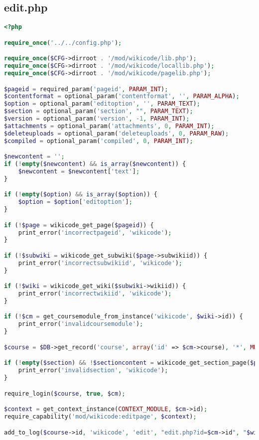 \subsection{edit.php}
\begin{lstlisting}[language=PHP]
<?php

require_once('../../config.php');

require_once($CFG->dirroot . '/mod/wikicode/lib.php');
require_once($CFG->dirroot . '/mod/wikicode/locallib.php');
require_once($CFG->dirroot . '/mod/wikicode/pagelib.php');

$pageid = required_param('pageid', PARAM_INT);
$contentformat = optional_param('contentformat', '', PARAM_ALPHA);
$option = optional_param('editoption', '', PARAM_TEXT);
$section = optional_param('section', "", PARAM_TEXT);
$version = optional_param('version', -1, PARAM_INT);
$attachments = optional_param('attachments', 0, PARAM_INT);
$deleteuploads = optional_param('deleteuploads', 0, PARAM_RAW);
$compiled = optional_param('compiled', 0, PARAM_INT);

$newcontent = '';
if (!empty($newcontent) && is_array($newcontent)) {
    $newcontent = $newcontent['text'];
} 

if (!empty($option) && is_array($option)) {
    $option = $option['editoption'];
}

if (!$page = wikicode_get_page($pageid)) {
    print_error('incorrectpageid', 'wikicode');
}

if (!$subwiki = wikicode_get_subwiki($page->subwikiid)) {
    print_error('incorrectsubwikiid', 'wikicode');
}

if (!$wiki = wikicode_get_wiki($subwiki->wikiid)) {
    print_error('incorrectwikiid', 'wikicode');
}

if (!$cm = get_coursemodule_from_instance('wikicode', $wiki->id)) {
    print_error('invalidcoursemodule');
}

$course = $DB->get_record('course', array('id' => $cm->course), '*', MUST_EXIST);

if (!empty($section) && !$sectioncontent = wikicode_get_section_page($page, $section)) {
    print_error('invalidsection', 'wikicode');
}

require_login($course, true, $cm);

$context = get_context_instance(CONTEXT_MODULE, $cm->id);
require_capability('mod/wikicode:editpage', $context);

add_to_log($course->id, 'wikicode', 'edit', "edit.php?id=$cm->id", "$wiki->id");


\end{lstlisting}
